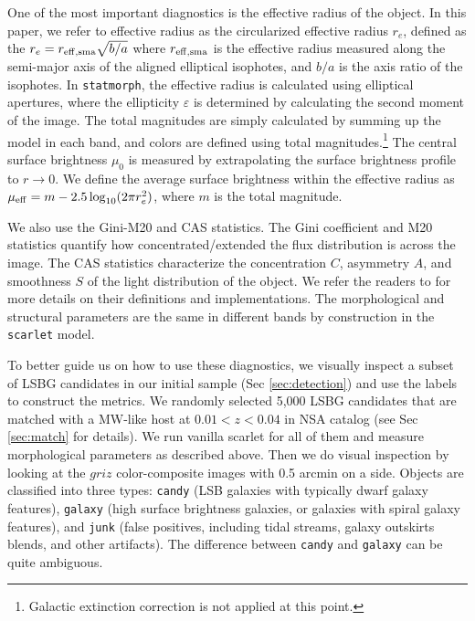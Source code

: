 \documentclass[twocolumn,astrosymb,twocolappendix]{aastex631}
\newcommand{\code}[1]{\texttt{#1}}
\begin{document}
\begin{CJK*}{UTF8}{gbsn}
One of the most important diagnostics is the effective radius of the object. In this paper, we refer to effective radius as the circularized effective radius $r_{e}$, defined as the $r_{e} = r_{\rm eff, sma} \sqrt{b/a}$ where $r_{\rm eff, sma}$ is the effective radius measured along the semi-major axis of the aligned elliptical isophotes, and $b/a$ is the axis ratio of the isophotes. In \code{statmorph}, the effective radius is calculated using elliptical apertures, where the ellipticity $\varepsilon$ is determined by calculating the second moment of the image. The total magnitudes are simply calculated by summing up the model in each band, and colors are defined using total magnitudes.\footnote{Galactic extinction correction is not applied at this point.} The central surface brightness $\mu_0$ is measured by extrapolating the surface brightness profile to $r\to 0$. We define the average surface brightness within the effective radius as $\mu_{\rm eff} = m - 2.5 \log_{10}(2 \pi r_e^2)$, where $m$ is the total magnitude. 

We also use the Gini-M20 and CAS statistics. The Gini coefficient and M20 statistics \citep{Abraham2003,Lotz2004} quantify how concentrated/extended the flux distribution is across the image. The CAS statistics characterize the concentration $C$, asymmetry $A$, and smoothness $S$ of the light distribution of the object. We refer the readers to \citet{statmorph} for more details on their definitions and implementations. The morphological and structural parameters are the same in different bands by construction in the \code{scarlet} model.

To better guide us on how to use these diagnostics, we visually inspect a subset of LSBG candidates in our initial sample (Sec \ref{sec:detection}) and use the labels to construct the metrics. We randomly selected 5,000 LSBG candidates that are matched with a MW-like host at $0.01 < z < 0.04$ in NSA catalog (see Sec \ref{sec:match} for details). We run vanilla scarlet for all of them and measure morphological parameters as described above. Then we do visual inspection by looking at the $griz$ color-composite images with 0.5 arcmin on a side. Objects are classified into three types: \code{candy} (LSB galaxies with typically dwarf galaxy features), \code{galaxy} (high surface brightness galaxies, or galaxies with spiral galaxy features), and \code{junk} (false positives, including tidal streams, galaxy outskirts blends, and other artifacts). The difference between \code{candy} and \code{galaxy} can be quite ambiguous. 


\end{CJK*}
\end{document}
